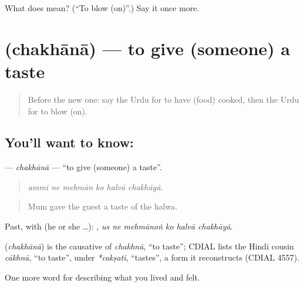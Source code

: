\begin{tcolorbox}[breakable,colback=teal!4,colframe=teal!35!black,title={Before you move on}]
What does  mean? (\textquotedblleft{}To blow (on)\textquotedblright{}.) Say it once more.
\end{tcolorbox}
\section[\texorpdfstring{\ur{چکھانا} (chakhānā)}{چکھانا (chakhānā)}]{ (chakhānā) — to give (someone) a taste}

\label{lesson:UR-C511-chakhana}



\begin{quote}
Before the new one: say the Urdu for to have (food) cooked, then the Urdu for to blow (on).
\end{quote}

\subsection*{You'll want to know: }
\textbf{} — \emph{chakhānā} — \textquotedblleft{}to give (someone) a taste\textquotedblright{}.

\begin{quote}
     
\end{quote}

\begin{quote}
\emph{ammī ne mehmān ko halvā chakhāyā.}
\end{quote}

\begin{quote}
Mum gave the guest a taste of the halwa.
\end{quote}

Past, with  (he or she …):      , \emph{us ne mehmānoṅ ko halvā chakhāyā}.

\begin{cousinweb}
\textbf{} (\emph{chakhānā}) is the causative of \emph{chakhnā}, \textquotedblleft{}to taste\textquotedblright{}; CDIAL lists the Hindi cousin \emph{cākhnā}, \textquotedblleft{}to taste\textquotedblright{}, under \emph{*cakṣati}, \textquotedblleft{}tastes\textquotedblright{}, a form it reconstructs (CDIAL 4557).
\end{cousinweb}

\begin{grammarlens}[title={What you've built}]
One more word for describing what you lived and felt.
\end{grammarlens}

